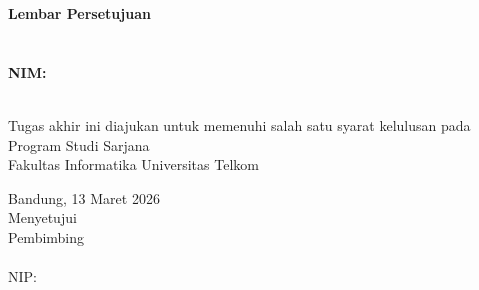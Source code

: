 {\centering
\textbf{\large Lembar Persetujuan}\\
\vspace{0.5cm}
\textbf{\Title}\\
\vspace{0.5cm}
\textbf{\textit{\EngTitle}}\\
\vspace{0.5cm}
\textbf{NIM: \NIM}\\
\textbf{\Author}\\
\vspace{1cm}


{ Tugas akhir ini diajukan untuk memenuhi salah satu syarat kelulusan pada\\ Program Studi Sarjana \Prodi\\ Fakultas Informatika Universitas Telkom}\\

\vspace{0.5cm}

{Bandung, 13 Maret 2026}\\
{Menyetujui}\\

Pembimbing\\[2.2cm]

\underline{\PembimbingSatu}\\
NIP: \NIPPembimbingSatu\\[0.5cm]


}

